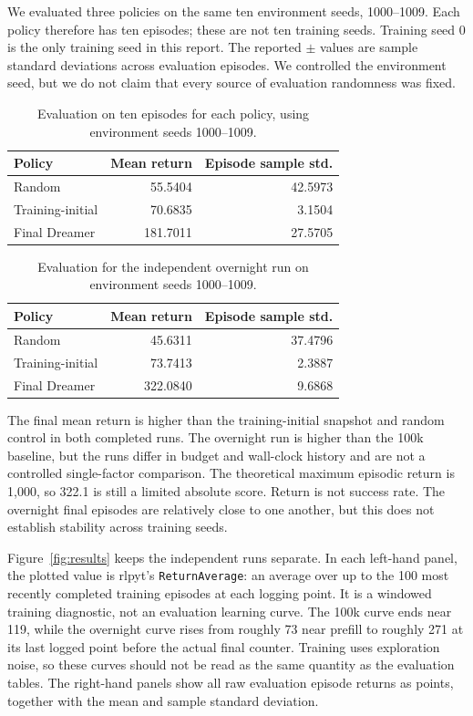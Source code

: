 \documentclass{article}
\begin{document}
We evaluated three policies on the same ten environment seeds, 1000--1009. Each policy therefore has ten episodes; these are not ten training seeds. Training seed 0 is the only training seed in this report. The reported $\pm$ values are sample standard deviations across evaluation episodes. We controlled the environment seed, but we do not claim that every source of evaluation randomness was fixed.

\begin{table}[t]
\caption{Evaluation on ten episodes for each policy, using environment seeds 1000--1009.}
\label{tab:returns}
\centering\small
\begin{tabular}{lrr}
\toprule
Policy & Mean return & Episode sample std. \\
\midrule
Random & 55.5404 & 42.5973 \\
Training-initial & 70.6835 & 3.1504 \\
Final Dreamer & 181.7011 & 27.5705 \\
\bottomrule
\end{tabular}
\end{table}

\begin{table}[t]
\caption{Evaluation for the independent overnight run on environment seeds 1000--1009.}
\centering\small
\begin{tabular}{lrr}
\toprule
Policy & Mean return & Episode sample std. \\
\midrule
Random & 45.6311 & 37.4796 \\
Training-initial & 73.7413 & 2.3887 \\
Final Dreamer & 322.0840 & 9.6868 \\
\bottomrule
\end{tabular}
\end{table}

The final mean return is higher than the training-initial snapshot and random control in both completed runs. The overnight run is higher than the 100k baseline, but the runs differ in budget and wall-clock history and are not a controlled single-factor comparison. The theoretical maximum episodic return is 1,000, so 322.1 is still a limited absolute score. Return is not success rate. The overnight final episodes are relatively close to one another, but this does not establish stability across training seeds.

Figure~\ref{fig:results} keeps the independent runs separate. In each left-hand panel, the plotted value is rlpyt's \texttt{ReturnAverage}: an average over up to the 100 most recently completed training episodes at each logging point. It is a windowed training diagnostic, not an evaluation learning curve. The 100k curve ends near 119, while the overnight curve rises from roughly 73 near prefill to roughly 271 at its last logged point before the actual final counter. Training uses exploration noise, so these curves should not be read as the same quantity as the evaluation tables. The right-hand panels show all raw evaluation episode returns as points, together with the mean and sample standard deviation.
\end{document}
